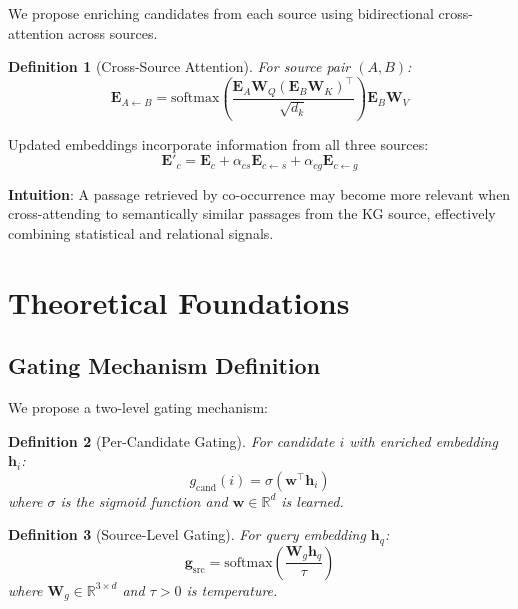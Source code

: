 \documentclass[10pt,twocolumn]{article}
\newtheorem{definition}{Definition}
\begin{document}
We propose enriching candidates from each source using bidirectional cross-attention across sources.

\begin{definition}[Cross-Source Attention]
For source pair $(A, B)$:
\begin{equation}
\mathbf{E}_{A \leftarrow B} = \text{softmax}\left(\frac{\mathbf{E}_A \mathbf{W}_Q (\mathbf{E}_B \mathbf{W}_K)^\top}{\sqrt{d_k}}\right) \mathbf{E}_B \mathbf{W}_V
\end{equation}
\end{definition}

Updated embeddings incorporate information from all three sources:
\begin{equation}
\mathbf{E}'_c = \mathbf{E}_c + \alpha_{cs}\mathbf{E}_{c \leftarrow s} + \alpha_{cg}\mathbf{E}_{c \leftarrow g}
\end{equation}

\textbf{Intuition}: A passage retrieved by co-occurrence may become more relevant when cross-attending to semantically similar passages from the KG source, effectively combining statistical and relational signals.

\section{Theoretical Foundations}
\label{sec:theory}

\subsection{Gating Mechanism Definition}

We propose a two-level gating mechanism:

\begin{definition}[Per-Candidate Gating]
For candidate $i$ with enriched embedding $\mathbf{h}_i$:
\begin{equation}
g_{\text{cand}}(i) = \sigma(\mathbf{w}^\top \mathbf{h}_i)
\label{eq:cand_gate}
\end{equation}
where $\sigma$ is the sigmoid function and $\mathbf{w} \in \mathbb{R}^d$ is learned.
\end{definition}

\begin{definition}[Source-Level Gating]
For query embedding $\mathbf{h}_q$:
\begin{equation}
\mathbf{g}_{\text{src}} = \text{softmax}\left( \frac{\mathbf{W}_g \mathbf{h}_q}{\tau} \right)
\label{eq:src_gate}
\end{equation}
where $\mathbf{W}_g \in \mathbb{R}^{3 \times d}$ and $\tau > 0$ is temperature.
\end{definition}
\end{document}
